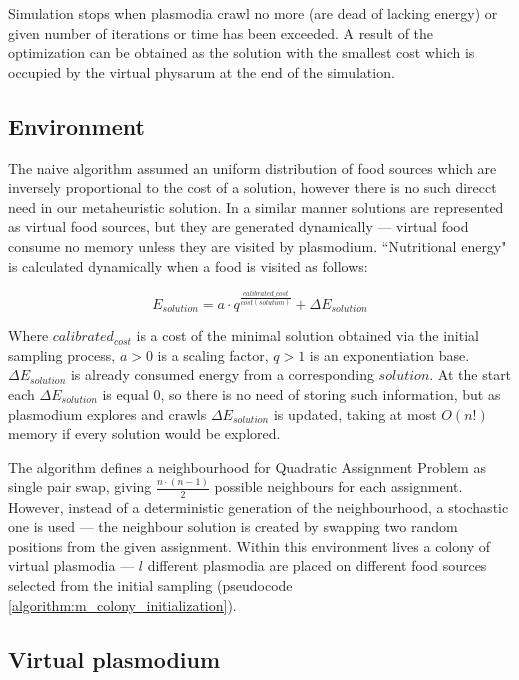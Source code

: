 \documentclass[english,a4paper,twoside]{ppfcmthesis}
\begin{document}
Simulation stops when plasmodia crawl no more (are dead of lacking energy) or given number of iterations or time has been exceeded. A result of the optimization can be obtained as the solution with the smallest cost which is occupied by the virtual physarum at the end of the simulation.


\subsection{Environment}

The naive algorithm assumed an uniform distribution of food sources which are inversely proportional to the cost of a solution, however there is no such direcct need in our metaheuristic solution. In a similar manner solutions are represented as virtual food sources, but they are generated dynamically --- virtual food consume no memory unless they are visited by plasmodium. ``Nutritional energy" is calculated dynamically when a food is visited as follows: 

\begin{equation}
  E_{solution} = a \cdot q^{\frac{calibrated\_cost}{cost(solution)}} + {\Delta}E_{solution}
  \label{equation:m_e_solution}
\end{equation}

Where $calibrated_{cost}$ is a cost of the minimal solution obtained via the initial sampling process, $a > 0$ is a scaling factor, $q > 1$ is an exponentiation base. ${\Delta}E_{solution}$ is already consumed energy from a corresponding $solution$. At the start each ${\Delta}E_{solution}$ is equal $0$, so there is no need of storing such information, but as plasmodium explores and crawls ${\Delta}E_{solution}$ is updated, taking at most $O(n!)$ memory if every solution would be explored.

The algorithm defines a neighbourhood for Quadratic Assignment Problem as single pair swap, giving $\frac{n\cdot(n-1)}{2}$ possible neighbours for each assignment. However, instead of a deterministic generation of the neighbourhood, a stochastic one is used --- the neighbour solution is created by swapping two random positions from the given assignment. Within this environment lives a colony of virtual plasmodia --- $l$ different plasmodia are placed on different food sources selected from the initial sampling (pseudocode \ref{algorithm:m_colony_initialization}). 

\subsection{Virtual plasmodium}
\end{document}
